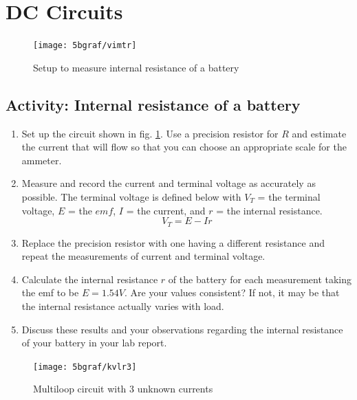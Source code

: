\section {DC Circuits}

\begin{figure}
	\centering
	\texttt{[image: 5bgraf/vimtr]} %
	\caption{Setup to measure internal resistance of a battery}
	\label{f:vimtr}
\end{figure}

\subsection{Activity: Internal resistance of a battery}
\begin{enumerate}
	 \item Set up the circuit shown in fig. \ref{f:vimtr}.  Use a precision resistor for $R$ and estimate the current that will flow so that you can choose an appropriate scale for the ammeter.
	\item Measure and record the current and terminal voltage as accurately as possible. The terminal voltage is defined below with $V_T$ = the terminal voltage, $E$ = the $emf$, $I$ = the current, and $r$ = the internal resistance.
\begin{equation} \label{e:vterm}
	V_T  =  E -Ir 	%
\end{equation}
	\item Replace the precision resistor with one having a different resistance and repeat the measurements of current and terminal voltage.
	\item Calculate the internal resistance $r$ of the battery for each measurement taking the emf to be $E = 1.54 V$.  Are your values consistent?  If not, it may be that the internal resistance actually varies with load.
	\item Discuss these results and your observations regarding the internal resistance of your battery in your lab report.
\end{enumerate}

\begin{figure}
	\centering
	\texttt{[image: 5bgraf/kvlr3]}	 %
	\caption{Multiloop circuit with 3 unknown currents}
	\label{f:kvlr3}
\end{figure}

